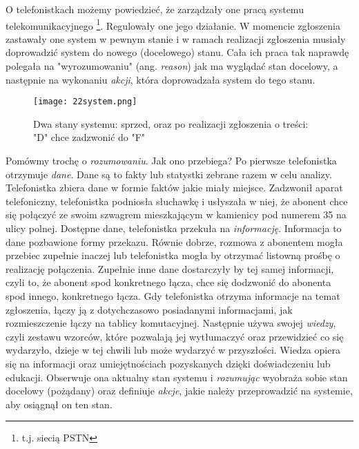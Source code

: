 O telefonistkach możemy powiedzieć, że zarządzały one pracą systemu telekomunikacyjnego \footnote{t.j. siecią PSTN}. Regulowały one jego działanie. W momencie zgłoszenia zastawały one system w pewnym stanie i w ramach realizacji zgłoszenia musiały doprowadzić system do nowego (docelowego) stanu. Cała ich praca tak naprawdę polegała na "wyrozumowaniu" (ang. \textit{reason}) jak ma wyglądać stan docelowy, a następnie na wykonaniu \textit{akcji}, która doprowadzała system do tego stanu. 

\begin{figure}[!h]
    \centering \texttt{[image: 22system.png]}
    \caption{Dwa stany systemu: sprzed, oraz po realizacji zgłoszenia o treści: "D" chce zadzwonić do "F"}\label{fig:}
\end{figure}

Pomówmy trochę o \textit{rozumowaniu}. Jak ono przebiega? Po pierwsze telefonistka otrzymuje \textit{dane}. Dane są to fakty lub statystki zebrane razem w celu analizy. Telefonistka zbiera dane w formie faktów jakie miały miejsce. Zadzwonił aparat telefoniczny, telefonistka podniosła słuchawkę i usłyszała w niej, że abonent chce się połączyć ze swoim szwagrem mieszkającym w kamienicy pod numerem 35 na ulicy polnej. Dostępne dane, telefonistka przekuła na \textit{informację}. Informacja to dane pozbawione formy przekazu. Równie dobrze, rozmowa z abonentem mogła przebiec zupełnie inaczej lub telefonistka mogła by otrzymać listowną prośbę o realizację połączenia. Zupełnie inne dane dostarczyły by tej samej informacji, czyli to, że abonent spod konkretnego łącza, chce się dodzwonić do abonenta spod innego, konkretnego łącza. Gdy telefonistka otrzyma informacje na temat zgłoszenia, łączy ją z dotychczasowo posiadanymi informacjami, jak rozmieszczenie łączy na tablicy komutacyjnej. Następnie używa swojej \textit{wiedzy}, czyli zestawu wzorców, które pozwalają jej wytłumaczyć oraz przewidzieć co się wydarzyło, dzieje w tej chwili lub może wydarzyć w przyszłości. Wiedza opiera się na informacji oraz umiejętnościach pozyskanych dzięki doświadczeniu lub edukacji.  Obserwuje ona aktualny stan systemu i \textit{rozumując} wyobraża sobie stan docelowy (pożądany) oraz definiuje \textit{akcje}, jakie należy przeprowadzić na systemie, aby osiągnął on ten stan. 



